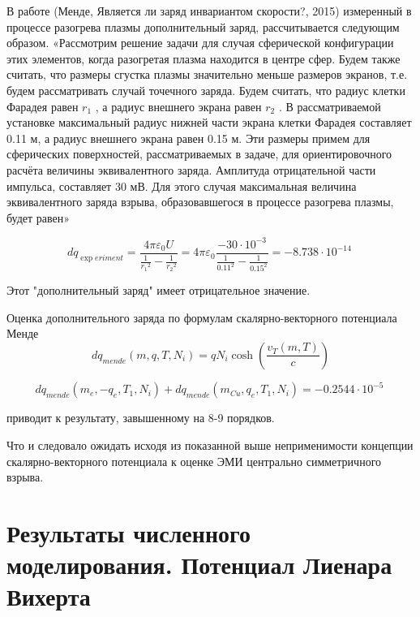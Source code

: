 \documentclass[12pt]{article}
\begin{document}
В работе (Менде, Является ли заряд инвариантом скорости?, 2015) измеренный в процессе разогрева плазмы дополнительный заряд, рассчитывается следующим образом. «Рассмотрим решение задачи для случая сферической конфигурации этих элементов, когда разогретая плазма находится в центре сфер. Будем также считать, что размеры сгустка плазмы значительно меньше размеров экранов, т.е. будем рассматривать случай точечного заряда. Будем считать, что радиус клетки Фарадея равен ${{r}_{1}}$ , а радиус внешнего экрана равен ${{r}_{2}}$ . В рассматриваемой установке максимальный радиус нижней части экрана клетки Фарадея составляет 0.11 м, а радиус внешнего экрана равен 0.15 м. Эти размеры примем для сферических поверхностей, рассматриваемых в задаче, для ориентировочного расчёта величины эквивалентного заряда. Амплитуда отрицательной части импульса, составляет 30 мВ. Для этого случая максимальная величина эквивалентного заряда взрыва, образовавшегося в процессе разогрева плазмы, будет равен» 

$$d{{q}_{\exp eriment}}=\frac{4\pi {{\varepsilon }_{0}}U}{\frac{1}{{{r}_{1}}^{2}}-\frac{1}{{{r}_{2}}^{2}}}=4\pi {{\varepsilon }_{0}}\frac{-30\cdot {{10}^{-3}}}{\frac{1}{{{0.11}^{2}}}-\frac{1}{{{0.15}^{2}}}}=-8.738\cdot {{10}^{-14}}\ $$

Этот "дополнительный заряд" имеет отрицательное значение.


Оценка дополнительного заряда по формулам скалярно-векторного потенциала Менде
$$d{{q}_{mende}}(m,q,T,{{N}_{i}})=q{{N}_{i}}\cosh \left( \frac{{{v}_{T}}\left( m,T \right)}{c} \right)$$

$$d{{q}_{mende}}({{m}_{e}},-{{q}_{e}},{{T}_{1}},{{N}_{i}})+d{{q}_{mende}}({{m}_{Cu}},{{q}_{e}},{{T}_{1}},{{N}_{i}})=-0.2544\cdot {{10}^{-5}}\ $$

приводит к результату, завышенному на 8-9 порядков. 

Что и следовало ожидать исходя из показанной выше неприменимости концепции скалярно-векторного потенциала к оценке ЭМИ центрально симметричного взрыва.


\section{Результаты численного моделирования. Потенциал Лиенара Вихерта}
\end{document}
